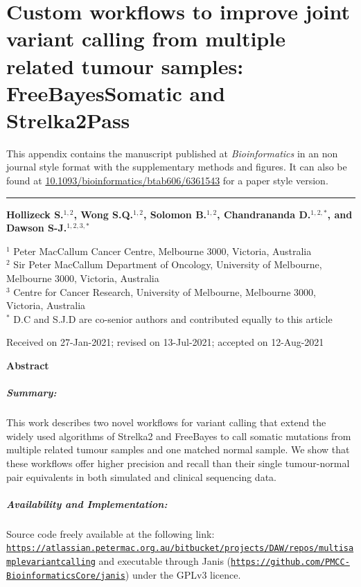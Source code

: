 \chapter[Strelka2Pass and FreeBayesSomatic publication]{Custom workflows to improve joint variant calling from multiple related tumour samples: FreeBayesSomatic and Strelka2Pass}
\label{ch:appendixManuscript}

This appendix contains the manuscript published at \textit{Bioinformatics} in an non journal style format with the supplementary methods and figures. It can also be found at \href{https://doi.org/10.1093/bioinformatics/btab606/6361543}{10.1093/bioinformatics/btab606/6361543} for a paper style version.
\vspace{1em}
\hrule
\vspace{2em}

{\Large \textbf{Hollizeck S.$^{1,2}$, Wong S.Q.$^{1,2}$, Solomon B.$^{1,2}$, Chandrananda D.$^{1,2,*}$, and Dawson S-J.$^{1,2,3,*}$}}

{
$^1$ Peter MacCallum Cancer Centre, Melbourne 3000, Victoria, Australia\\
$^2$ Sir Peter MacCallum Department of Oncology, University of Melbourne, Melbourne 3000, Victoria, Australia\\
$^3$ Centre for Cancer Research, University of Melbourne, Melbourne 3000, Victoria, Australia\\
\vspace{0.5em}
$^*$ D.C and S.J.D are co-senior authors and contributed equally to this article
}

{\small
Received on 27-Jan-2021; revised on 13-Jul-2021; accepted on 12-Aug-2021
}

{\Large \textbf{Abstract}}
\vspace{-2em}
\paragraph{\textbf{Summary:}} This work describes two novel workflows for variant calling that extend the widely used algorithms of Strelka2 and FreeBayes to call somatic mutations from multiple related tumour samples and one matched normal sample. We show that these workflows offer higher precision and recall than their single tumour-normal pair equivalents in both simulated and clinical sequencing data.
\vspace{-2em}
\paragraph{\textbf{Availability and Implementation:}} Source code freely available at the following link:
\href{https://atlassian.petermac.org.au/bitbucket/projects/DAW/repos/multisamplevariantcalling}{\nolinkurl{https://atlassian.petermac.org.au/bitbucket/projects/DAW/repos/multisamplevariantcalling}}
and executable through Janis (\href{https://github.com/PMCC-BioinformaticsCore/janis}{\nolinkurl{https://github.com/PMCC-BioinformaticsCore/janis}}) under the GPLv3 licence.
\vspace{-2em}
